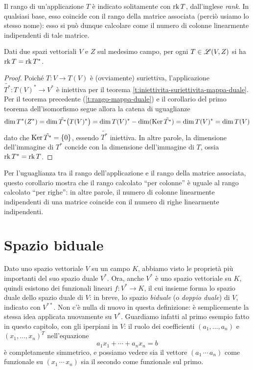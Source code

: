 Il rango di un'applicazione $T$ è indicato solitamente con $\operatorname{rk} T$, dall'inglese \textit{rank}.
In qualsiasi base, esso coincide con il rango della matrice associata (perciò usiamo lo stesso nome): esso si può dunque calcolare come il numero di colonne linearmente indipendenti di tale matrice.
\begin{corollario} \label{c:rango-righe-colonne}
	Dati due spazi vettoriali $V$ e $Z$ sul medesimo campo, per ogni $T\in\mathscr L(V,Z)$ si ha $\operatorname{rk} T=\operatorname{rk} T^*$.
\end{corollario}
\begin{proof}
	Poich\'e $T\colon V\to T(V)$ è (ovviamente) suriettiva, l'applicazione $\tilde{T^*}\colon T(V)^*\to V^*$ è iniettiva per il teorema \ref{t:iniettivita-suriettivita-mappa-duale}.
	Per il teorema precedente (\ref{t:rango-mappa-duale}) e il corollario del primo teorema dell'isomorfismo segue allora la catena di uguaglianze
	\begin{equation}
		\dim T^*(Z^*)=\dim\tilde{T^*}\big(T(V)^*\big)=\dim T(V)^*-\dim(\operatorname{Ker}\tilde{T^*})=\dim T(V)^*=\dim T(V)
	\end{equation}
	dato che $\operatorname{Ker}\tilde{T^*}=\{0\}$, essendo $\tilde{T^*}$ iniettiva.
	In altre parole, la dimensione dell'immagine di $T^*$ concide con la dimensione dell'immagine di $T$, ossia $\operatorname{rk} T^*=\operatorname{rk} T$.
\end{proof}
Per l'uguaglianza tra il rango dell'applicazione e il rango della matrice associata, questo corollario mostra che il rango calcolato ``per colonne'' è uguale al rango calcolato ``per righe'': in altre parole, il numero di colonne linearmente indipendenti di una matrice coincide con il numero di righe linearmente indipendenti.

\section{Spazio biduale}
Dato uno spazio vettoriale $V$ su un campo $K$, abbiamo visto le proprietà più importanti del suo spazio duale $V^*$.
Ora, anche $V^*$ è uno spazio vettoriale su $K$, quindi esistono dei funzionali lineari $f\colon V^*\to K$, il cui insieme forma lo spazio duale dello spazio duale di $V$: in breve, lo spazio \emph{biduale} (o \emph{doppio duale}) di $V$, indicato con $V^{**}$.
Non c'è nulla di nuovo in questa definizione: è semplicemente la stessa idea applicata nuovamente su $V^*$.
Guardiamo infatti al primo esempio fatto in questo capitolo, con gli iperpiani in $V$: il ruolo dei coefficienti $(a_1,\dots,a_n)$ e $(x_1,\dots,x_n)^T$ nell'equazione
\begin{equation*}
	a_1x_1+\cdots+a_nx_n=b
\end{equation*}
è completamente simmetrico, e possiamo vedere sia il vettore $(a_1\,\cdots\,a_n)$ come funzionale su $(x_1\,\cdots\,x_n)$ sia il secondo come funzionale sul primo.

